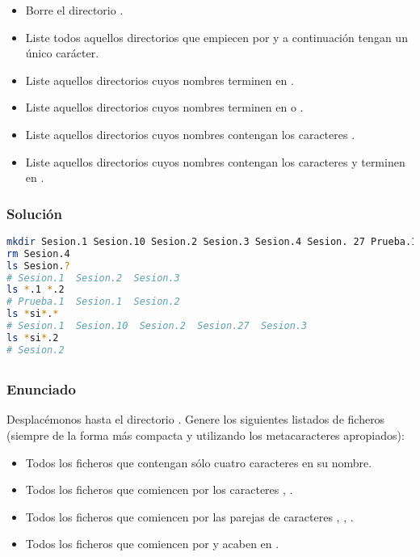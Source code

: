 \begin{itemize}
	\item Borre el directorio .
	\item Liste todos aquellos directorios que empiecen por  y a continuación tengan un único carácter.
	\item Liste aquellos directorios cuyos nombres terminen en .
	\item Liste aquellos directorios cuyos nombres terminen en  o .
	\item Liste aquellos directorios cuyos nombres contengan los caracteres .
	\item Liste aquellos directorios cuyos nombres contengan los caracteres  y terminen en .
\end{itemize}

\subsubsection{Solución}

\begin{lstlisting}[language=sh]
mkdir Sesion.1 Sesion.10 Sesion.2 Sesion.3 Sesion.4 Sesion. 27 Prueba.1
rm Sesion.4
ls Sesion.?
# Sesion.1  Sesion.2  Sesion.3
ls *.1 *.2
# Prueba.1  Sesion.1  Sesion.2
ls *si*.*
# Sesion.1  Sesion.10  Sesion.2  Sesion.27  Sesion.3
ls *si*.2
# Sesion.2
\end{lstlisting}

\subsection{}\label{ej1-7}

\subsubsection{Enunciado}

Desplacémonos hasta el directorio .
Genere los siguientes listados de ficheros (siempre de la forma más compacta y utilizando los metacaracteres apropiados):

\begin{itemize}
	\item Todos los ficheros que contengan sólo cuatro caracteres en su nombre.
	\item Todos los ficheros que comiencen por los caracteres , .
	\item Todos los ficheros que comiencen por las parejas de caracteres , , .
	\item Todos los ficheros que comiencen por  y acaben en .
\end{itemize}

